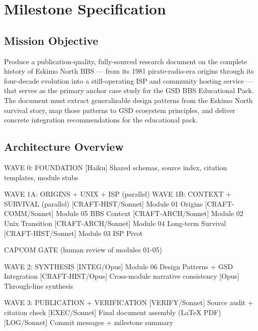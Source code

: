 \documentclass[11pt,letterpaper]{article}
\newcommand{\stageheader}[2]{%
  \noindent\colorbox{#2}{\makebox[\textwidth][l]{%
    \textcolor{white}{\bfseries\sffamily\hspace{6pt}#1\hspace{6pt}}}}%
  \vspace{0.5em}\par%
}
\begin{document}
\newpage
\stageheader{STAGE 3 --- MISSION PACKAGE}{tertiary}

\section{Milestone Specification}

\subsection{Mission Objective}

Produce a publication-quality, fully-sourced research document on the complete history of Eskimo North BBS --- from its 1981 pirate-radio-era origins through its four-decade evolution into a still-operating ISP and community hosting service --- that serves as the primary anchor case study for the GSD BBS Educational Pack. The document must extract generalizable design patterns from the Eskimo North survival story, map those patterns to GSD ecosystem principles, and deliver concrete integration recommendations for the educational pack.

\subsection{Architecture Overview}

\begin{asciibox}
WAVE 0: FOUNDATION
  [Haiku] Shared schemas, source index, citation templates, module stubs

WAVE 1A: ORIGINS + UNIX + ISP (parallel)         WAVE 1B: CONTEXT + SURVIVAL (parallel)
  [CRAFT-HIST/Sonnet] Module 01 Origins              [CRAFT-COMM/Sonnet] Module 05 BBS Context
  [CRAFT-ARCH/Sonnet] Module 02 Unix Transition      [CRAFT-ARCH/Sonnet] Module 04 Long-term Survival
  [CRAFT-HIST/Sonnet] Module 03 ISP Pivot

              CAPCOM GATE (human review of modules 01-05)

WAVE 2: SYNTHESIS
  [INTEG/Opus] Module 06 Design Patterns + GSD Integration
  [CRAFT-HIST/Opus] Cross-module narrative consistency
  [Opus] Through-line synthesis

WAVE 3: PUBLICATION + VERIFICATION
  [VERIFY/Sonnet] Source audit + citation check
  [EXEC/Sonnet] Final document assembly (LaTeX PDF)
  [LOG/Sonnet] Commit messages + milestone summary
\end{asciibox}
\end{document}
